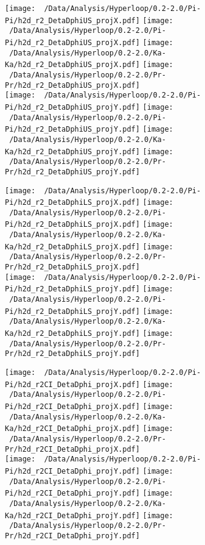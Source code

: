 \documentclass[ALICE,manyauthors]{ALICE_analysis_notes}
\begin{document}
\begin{figure}[h!]
	\hfill
	\centering
	\texttt{[image: ~/Data/Analysis/Hyperloop/0.2-2.0/Pi-Pi/h2d\_r2\_DetaDphiUS\_projX.pdf]}
	\texttt{[image: ~/Data/Analysis/Hyperloop/0.2-2.0/Pi-Pi/h2d\_r2\_DetaDphiUS\_projX.pdf]}
	\texttt{[image: ~/Data/Analysis/Hyperloop/0.2-2.0/Ka-Ka/h2d\_r2\_DetaDphiUS\_projX.pdf]}
	\texttt{[image: ~/Data/Analysis/Hyperloop/0.2-2.0/Pr-Pr/h2d\_r2\_DetaDphiUS\_projX.pdf]}
	\\
	\hfill
	\texttt{[image: ~/Data/Analysis/Hyperloop/0.2-2.0/Pi-Pi/h2d\_r2\_DetaDphiUS\_projY.pdf]}
	\texttt{[image: ~/Data/Analysis/Hyperloop/0.2-2.0/Pi-Pi/h2d\_r2\_DetaDphiUS\_projY.pdf]}
	\texttt{[image: ~/Data/Analysis/Hyperloop/0.2-2.0/Ka-Ka/h2d\_r2\_DetaDphiUS\_projY.pdf]}
	\texttt{[image: ~/Data/Analysis/Hyperloop/0.2-2.0/Pr-Pr/h2d\_r2\_DetaDphiUS\_projY.pdf]}
	\\
\end{figure}
\begin{figure}[h!]
	\hfill
	\centering
	\texttt{[image: ~/Data/Analysis/Hyperloop/0.2-2.0/Pi-Pi/h2d\_r2\_DetaDphiLS\_projX.pdf]}
	\texttt{[image: ~/Data/Analysis/Hyperloop/0.2-2.0/Pi-Pi/h2d\_r2\_DetaDphiLS\_projX.pdf]}
	\texttt{[image: ~/Data/Analysis/Hyperloop/0.2-2.0/Ka-Ka/h2d\_r2\_DetaDphiLS\_projX.pdf]}
	\texttt{[image: ~/Data/Analysis/Hyperloop/0.2-2.0/Pr-Pr/h2d\_r2\_DetaDphiLS\_projX.pdf]}
	\\
	\hfill
	\texttt{[image: ~/Data/Analysis/Hyperloop/0.2-2.0/Pi-Pi/h2d\_r2\_DetaDphiLS\_projY.pdf]}
	\texttt{[image: ~/Data/Analysis/Hyperloop/0.2-2.0/Pi-Pi/h2d\_r2\_DetaDphiLS\_projY.pdf]}
	\texttt{[image: ~/Data/Analysis/Hyperloop/0.2-2.0/Ka-Ka/h2d\_r2\_DetaDphiLS\_projY.pdf]}
	\texttt{[image: ~/Data/Analysis/Hyperloop/0.2-2.0/Pr-Pr/h2d\_r2\_DetaDphiLS\_projY.pdf]}
\end{figure}
\begin{figure}[h!]
	\hfill
	\centering
	\texttt{[image: ~/Data/Analysis/Hyperloop/0.2-2.0/Pi-Pi/h2d\_r2CI\_DetaDphi\_projX.pdf]}
	\texttt{[image: ~/Data/Analysis/Hyperloop/0.2-2.0/Pi-Pi/h2d\_r2CI\_DetaDphi\_projX.pdf]}
	\texttt{[image: ~/Data/Analysis/Hyperloop/0.2-2.0/Ka-Ka/h2d\_r2CI\_DetaDphi\_projX.pdf]}
	\texttt{[image: ~/Data/Analysis/Hyperloop/0.2-2.0/Pr-Pr/h2d\_r2CI\_DetaDphi\_projX.pdf]}
	\\
	\hfill
	\texttt{[image: ~/Data/Analysis/Hyperloop/0.2-2.0/Pi-Pi/h2d\_r2CI\_DetaDphi\_projY.pdf]}
	\texttt{[image: ~/Data/Analysis/Hyperloop/0.2-2.0/Pi-Pi/h2d\_r2CI\_DetaDphi\_projY.pdf]}
	\texttt{[image: ~/Data/Analysis/Hyperloop/0.2-2.0/Ka-Ka/h2d\_r2CI\_DetaDphi\_projY.pdf]}
	\texttt{[image: ~/Data/Analysis/Hyperloop/0.2-2.0/Pr-Pr/h2d\_r2CI\_DetaDphi\_projY.pdf]}
\end{figure}
\end{document}
